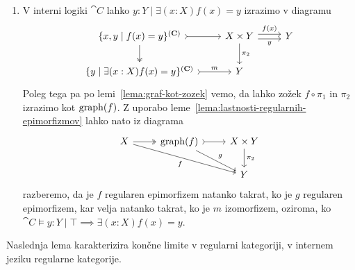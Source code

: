 \documentclass[../kategoricna_logika.tex]{subfiles}
\begin{document}
\begin{dokaz}
\begin{enumerate}[label=(\roman*)]
    \item V interni logiki $\cat{C}$ lahko $y:Y \mid \exists (x:X) f(x) = y$
      izrazimo v diagramu
      \begin{equation*}
        \begin{tikzcd}
          \{x,y \mid f(x) = y\}^{(\cat{C})} \ar[r, tail] \ar[d, two heads] & X \times Y \ar[r, shift left, "f(x)"] \ar[r, shift right, "y"'] \ar[d, "\pi_2"] & Y \\
          \{y \mid \exists (x:X) f(x) = y\}^{(\cat{C})} \ar[r, tail, "m"] & Y
        \end{tikzcd}
      \end{equation*}
      Poleg tega pa po lemi~\ref{lema:graf-kot-zozek} vemo, da lahko
      zožek $f \circ \pi_1$ in $\pi_2$ izrazimo kot $\operatorname{graph}(f)$.  Z
      uporabo leme~\ref{lema:lastnosti-regularnih-epimorfizmov} lahko
      nato iz diagrama
      \begin{equation*}
        \begin{tikzcd}
          X \ar[drr, "f"'] \ar[r, two heads] & \operatorname{graph}(f) \ar[dr, "g"] \ar[r, tail] & X \times Y \ar[d, "\pi_2"] \\
          & & Y
        \end{tikzcd}
      \end{equation*}
      razberemo, da je $f$ regularen epimorfizem natanko takrat, ko je
      $g$ regularen epimorfizem, kar velja natanko takrat, ko je $m$
      izomorfizem, oziroma, ko
      $\cat{C} \models y:Y \mid \top \implies \exists (x:X) f(x) = y$.\qedhere
    \end{enumerate}
  \end{dokaz}
  Naslednja lema karakterizira končne limite v regularni kategoriji, v
  internem jeziku regularne kategorije.
\end{document}
